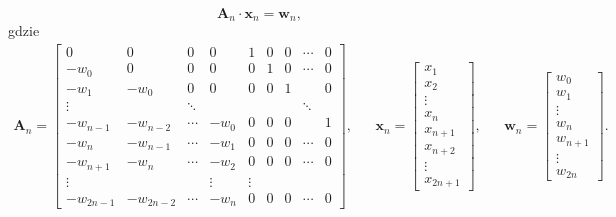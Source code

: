\documentclass[paper=a4,DIV=12]{lpas}
\begin{document}
\begin{appendices}
  \begin{equation}
    \mathbf{A}_n \cdot \mathbf{x}_n = \mathbf{w}_n,
    \label{eq:7CL5I}
  \end{equation}
  gdzie
  \begin{equation}
    \begin{aligned}
      \mathbf{A}_n = \begin{bmatrix}
         0         & 0         & 0       & 0      & 1 &  0  & 0 & \cdots & 0 \\
         -w_0      & 0         & 0       & 0      & 0 &  1  & 0 & \cdots & 0 \\
         -w_1      & -w_0      & 0       & 0      & 0 &  0  & 1 &        & 0 \\
         \vdots    &           & \ddots  &        &   &     &   & \ddots &   \\
         -w_{n-1}  & -w_{n-2}  & \cdots  & -w_0   & 0 &  0  & 0 &        & 1 \\
         -w_{n}    & -w_{n-1}  & \cdots  & -w_1   & 0 &  0  & 0 & \cdots & 0 \\
         -w_{n+1}  & -w_{n}    & \cdots  & -w_2   & 0 &  0  & 0 & \cdots & 0 \\
         \vdots    &           &         & \vdots & \vdots & &  &        &   \\
         -w_{2n-1} & -w_{2n-2} & \cdots  & -w_n   & 0 &  0  & 0 & \cdots & 0
      \end{bmatrix}, &
      & \mathbf{x}_n = \begin{bmatrix}
        x_1 \\ x_2 \\ \vdots \\ x_n \\
        x_{n+1} \\ x_{n+2} \\ \vdots \\ x_{2n+1}
      \end{bmatrix}, &
      & \mathbf{w}_n = \begin{bmatrix}
        w_0 \\ w_1 \\ \vdots \\ w_n \\ w_{n+1} \\ \vdots \\ w_{2n}
      \end{bmatrix}. &
    \end{aligned}
    \label{eq:VR42H}
  \end{equation}


\end{appendices}
\end{document}

